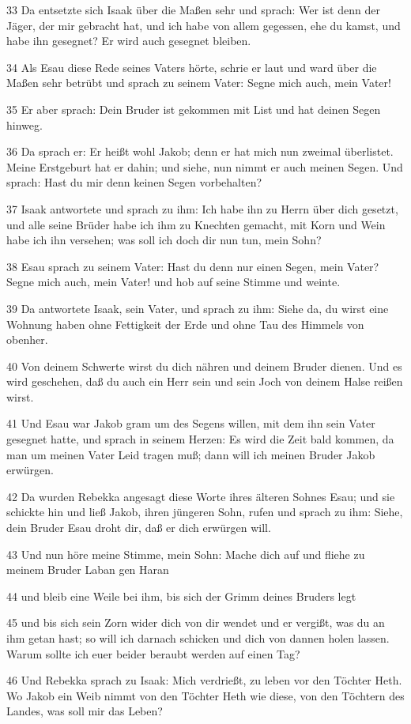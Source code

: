 \par 33 Da entsetzte sich Isaak über die Maßen sehr und sprach: Wer ist denn der Jäger, der mir gebracht hat, und ich habe von allem gegessen, ehe du kamst, und habe ihn gesegnet? Er wird auch gesegnet bleiben.
\par 34 Als Esau diese Rede seines Vaters hörte, schrie er laut und ward über die Maßen sehr betrübt und sprach zu seinem Vater: Segne mich auch, mein Vater!
\par 35 Er aber sprach: Dein Bruder ist gekommen mit List und hat deinen Segen hinweg.
\par 36 Da sprach er: Er heißt wohl Jakob; denn er hat mich nun zweimal überlistet. Meine Erstgeburt hat er dahin; und siehe, nun nimmt er auch meinen Segen. Und sprach: Hast du mir denn keinen Segen vorbehalten?
\par 37 Isaak antwortete und sprach zu ihm: Ich habe ihn zu Herrn über dich gesetzt, und alle seine Brüder habe ich ihm zu Knechten gemacht, mit Korn und Wein habe ich ihn versehen; was soll ich doch dir nun tun, mein Sohn?
\par 38 Esau sprach zu seinem Vater: Hast du denn nur einen Segen, mein Vater? Segne mich auch, mein Vater! und hob auf seine Stimme und weinte.
\par 39 Da antwortete Isaak, sein Vater, und sprach zu ihm: Siehe da, du wirst eine Wohnung haben ohne Fettigkeit der Erde und ohne Tau des Himmels von obenher.
\par 40 Von deinem Schwerte wirst du dich nähren und deinem Bruder dienen. Und es wird geschehen, daß du auch ein Herr sein und sein Joch von deinem Halse reißen wirst.
\par 41 Und Esau war Jakob gram um des Segens willen, mit dem ihn sein Vater gesegnet hatte, und sprach in seinem Herzen: Es wird die Zeit bald kommen, da man um meinen Vater Leid tragen muß; dann will ich meinen Bruder Jakob erwürgen.
\par 42 Da wurden Rebekka angesagt diese Worte ihres älteren Sohnes Esau; und sie schickte hin und ließ Jakob, ihren jüngeren Sohn, rufen und sprach zu ihm: Siehe, dein Bruder Esau droht dir, daß er dich erwürgen will.
\par 43 Und nun höre meine Stimme, mein Sohn: Mache dich auf und fliehe zu meinem Bruder Laban gen Haran
\par 44 und bleib eine Weile bei ihm, bis sich der Grimm deines Bruders legt
\par 45 und bis sich sein Zorn wider dich von dir wendet und er vergißt, was du an ihm getan hast; so will ich darnach schicken und dich von dannen holen lassen. Warum sollte ich euer beider beraubt werden auf einen Tag?
\par 46 Und Rebekka sprach zu Isaak: Mich verdrießt, zu leben vor den Töchter Heth. Wo Jakob ein Weib nimmt von den Töchter Heth wie diese, von den Töchtern des Landes, was soll mir das Leben?

